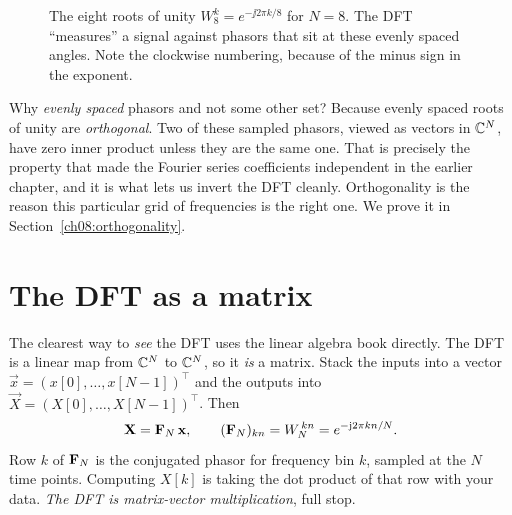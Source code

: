 \begin{figure}[H]
\centering
{}
\caption{The eight roots of unity $W_8^k = e^{-\jj 2\pi k/8}$ for $N=8$. The DFT
``measures'' a signal against phasors that sit at these evenly spaced angles. Note
the clockwise numbering, because of the minus sign in the exponent.}
\label{ch08:fig-roots}
\end{figure}

\begin{whybox}
Why \emph{evenly spaced} phasors and not some other set? Because evenly spaced
roots of unity are \emph{orthogonal}. Two of these sampled phasors, viewed as
vectors in $\mathbb{C}^N$, have zero inner product unless they are the same one. That is
precisely the property that made the Fourier series coefficients independent in
the earlier chapter, and it is what lets us invert the DFT cleanly. Orthogonality
is the reason this particular grid of frequencies is
the right one. We prove it in Section~\ref{ch08:orthogonality}.
\end{whybox}

\section{The DFT as a matrix}
\label{ch08:matrix}

The clearest way to \emph{see} the DFT uses the linear
algebra book directly. The DFT is a linear map from $\mathbb{C}^N$ to $\mathbb{C}^N$, so
it \emph{is} a matrix. Stack the inputs into a vector $\vec{x} = (x[0], \dots,
x[N-1])^\top$ and the outputs into $\vec{X} = (X[0], \dots, X[N-1])^\top$. Then
\[
\mathbf{X} = \mathbf{F}_N\, \mathbf{x}, \qquad (\mathbf{F}_N)_{kn} = W_N^{\,kn} = e^{-\mathrm{j} 2\pi k n / N}.
\]
Row $k$ of $\mathbf{F}_N$ is the conjugated phasor for frequency bin $k$, sampled at
the $N$ time points. Computing $X[k]$ is taking the dot product of that row with
your data. \emph{The DFT is matrix-vector multiplication}, full stop.


